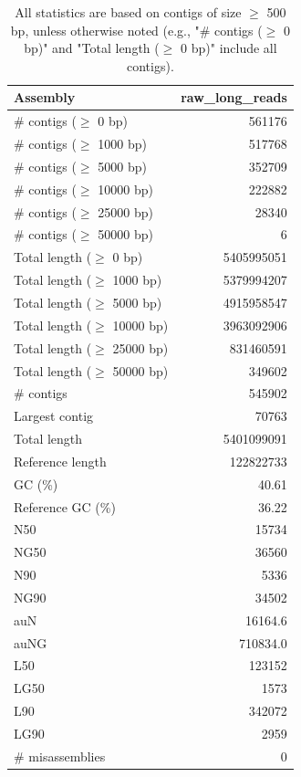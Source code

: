 \documentclass[12pt,a4paper]{article}
\begin{document}
\begin{table}[ht]
\begin{center}
\caption{All statistics are based on contigs of size $\geq$ 500 bp, unless otherwise noted (e.g., "\# contigs ($\geq$ 0 bp)" and "Total length ($\geq$ 0 bp)" include all contigs).}
\begin{tabular}{|l*{1}{|r}|}
\hline
Assembly & raw\_long\_reads \\ \hline
\# contigs ($\geq$ 0 bp) & 561176 \\ \hline
\# contigs ($\geq$ 1000 bp) & 517768 \\ \hline
\# contigs ($\geq$ 5000 bp) & 352709 \\ \hline
\# contigs ($\geq$ 10000 bp) & 222882 \\ \hline
\# contigs ($\geq$ 25000 bp) & 28340 \\ \hline
\# contigs ($\geq$ 50000 bp) & 6 \\ \hline
Total length ($\geq$ 0 bp) & 5405995051 \\ \hline
Total length ($\geq$ 1000 bp) & 5379994207 \\ \hline
Total length ($\geq$ 5000 bp) & 4915958547 \\ \hline
Total length ($\geq$ 10000 bp) & 3963092906 \\ \hline
Total length ($\geq$ 25000 bp) & 831460591 \\ \hline
Total length ($\geq$ 50000 bp) & 349602 \\ \hline
\# contigs & 545902 \\ \hline
Largest contig & 70763 \\ \hline
Total length & 5401099091 \\ \hline
Reference length & 122822733 \\ \hline
GC (\%) & 40.61 \\ \hline
Reference GC (\%) & 36.22 \\ \hline
N50 & 15734 \\ \hline
NG50 & 36560 \\ \hline
N90 & 5336 \\ \hline
NG90 & 34502 \\ \hline
auN & 16164.6 \\ \hline
auNG & 710834.0 \\ \hline
L50 & 123152 \\ \hline
LG50 & 1573 \\ \hline
L90 & 342072 \\ \hline
LG90 & 2959 \\ \hline
\# misassemblies & 0 \\ \hline

\end{tabular}
\end{center}
\end{table}
\end{document}
